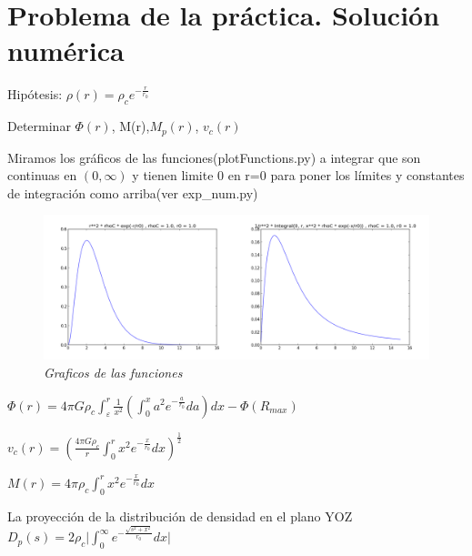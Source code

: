 \documentclass[12pt]{book}
\begin{document}
\section*{Problema de la práctica. Solución numérica}
\begin{description}
\item Hipótesis: $\rho(r) = \rho_c e^{-\frac{r}{r_0}} $
\item Determinar $\Phi(r)$, M(r),$M_p(r)$, $v_c(r)$ 

\end{description}


\begin{description}
\item Miramos los gráficos de las funciones(plotFunctions.py) a integrar que son continuas en $(0,\infty)$ y tienen limite 0 en r=0 para poner los límites y constantes de integración como arriba(ver exp\_num.py)
\begin{figure}[!ht]
 \centering
 \includegraphics[scale=0.33]{func12Plot.png}
 \caption{\emph{Graficos de las funciones}}
\end{figure}

\item $\Phi(r) = 4 \pi G \rho_c \int_\varepsilon^r{ \frac{1}{x^2}(\int_0^x{a^2 e^{-\frac{a}{r_0}}da})dx} -\Phi(R_{max})$
\item $v_c(r) = (\frac{4 \pi G \rho_c}{r}\int_0^r{x^2 e^{-\frac{x}{r_0}}dx} )^{\frac{1}{2}}  $ 
\item $M(r) = 4 \pi \rho_c \int_0^r{x^2 e^{-\frac{x}{r_0}}dx}$ 
\item La proyección de la distribución de densidad en el plano YOZ
$D_p(s) = 2 \rho_c \lvert \int_0^\infty{e^{-\frac{\sqrt{s^2 + x^2}}{r_0}} dx}  \rvert$


\end{description}
\end{document}
